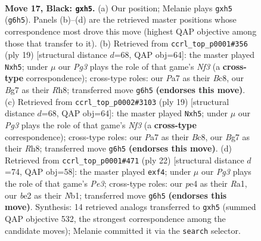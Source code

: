 \documentclass[11pt]{article}
\begin{document}
\begin{figure}[p]
\label{fig:thought-m31}
\end{figure}

\clearpage

\begin{figure}[p]\centering
\begin{subfigure}{0.46\textwidth}\centering
\resizebox{\linewidth}{!}{%
\newchessgame
\chessboard[
  setfen={rn1rn1k1/p4pbp/Pp2b1p1/1P2p2P/4P3/2N2N2/4BPP1/R1B1K2R b KQ - 0 17},
  showmover=false,
  pgfstyle=straightmove, color=movearrow, markmove={g6-h5}
]}
\caption{}
\end{subfigure}\hfill
\begin{subfigure}{0.46\textwidth}\centering
\resizebox{\linewidth}{!}{%
\newchessgame
\chessboard[
  setfen={rnb4r/p1k1ppbp/1p3np1/2p4P/2P1P3/2N1B3/PP3PP1/3RKBNR b K - 0 10},
  showmover=false,
  pgfstyle=straightmove, color=movearrow, markmove={f6-h5}
]}
\caption{}
\end{subfigure}
\\[4pt]
\begin{subfigure}{0.46\textwidth}\centering
\resizebox{\linewidth}{!}{%
\newchessgame
\chessboard[
  setfen={rnb4r/p1k1ppbp/1p3np1/2p4P/2P1P3/2N1B3/PP3PP1/3RKBNR b K - 0 10},
  showmover=false,
  pgfstyle=straightmove, color=movearrow, markmove={f6-h5}
]}
\caption{}
\end{subfigure}\hfill
\begin{subfigure}{0.46\textwidth}\centering
\resizebox{\linewidth}{!}{%
\newchessgame
\chessboard[
  setfen={r1bb1rk1/1pp3pp/2n2n2/p7/2P2p2/PPB1P3/4BPPP/RN2K1NR w KQ - 0 12},
  showmover=false,
  pgfstyle=straightmove, color=movearrow, markmove={e3-f4}
]}
\caption{}
\end{subfigure}
\caption{\textbf{Move 17, Black: \texttt{gxh5}.} (a) Our position; Melanie plays \texttt{gxh5} (\texttt{g6h5}). Panels (b)--(d) are the retrieved master positions whose correspondence most drove this move (highest QAP objective among those that transfer to it). (b) Retrieved from \texttt{ccrl\_top\_p0001\#356} (ply 19) [structural distance $d$=68, QAP obj=64]: the master played \texttt{Nxh5}; under $\mu$ our \emph{Pg3} plays the role of that game's \emph{Nf3} (a \textbf{cross-type} correspondence); cross-type roles: our \emph{P}a7 as their \emph{B}c8, our \emph{B}g7 as their \emph{R}h8; transferred move \texttt{g6h5} \textbf{(endorses this move)}. (c) Retrieved from \texttt{ccrl\_top\_p0002\#3103} (ply 19) [structural distance $d$=68, QAP obj=64]: the master played \texttt{Nxh5}; under $\mu$ our \emph{Pg3} plays the role of that game's \emph{Nf3} (a \textbf{cross-type} correspondence); cross-type roles: our \emph{P}a7 as their \emph{B}c8, our \emph{B}g7 as their \emph{R}h8; transferred move \texttt{g6h5} \textbf{(endorses this move)}. (d) Retrieved from \texttt{ccrl\_top\_p0001\#471} (ply 22) [structural distance $d$=74, QAP obj=58]: the master played \texttt{exf4}; under $\mu$ our \emph{Pg3} plays the role of that game's \emph{Pe3}; cross-type roles: our \emph{p}e4 as their \emph{R}a1, our \emph{b}e2 as their \emph{N}b1; transferred move \texttt{g6h5} \textbf{(endorses this move)}. Synthesis: 14 retrieved analogs transferred to \texttt{gxh5} (summed QAP objective 532, the strongest correspondence among the candidate moves); Melanie committed it via the \texttt{search} selector.}

\end{figure}
\end{document}
